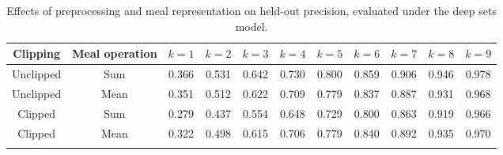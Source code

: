 
\begin{table}[!htbp]
\centering
\begin{tabular}{ccccccccccc}
\toprule
Clipping & Meal operation & $k=1$ & $k=2$ & $k=3$ & $k=4$ & $k=5$ & $k=6$ & $k=7$ & $k=8$ & $k=9$ \\
\midrule
Unclipped & Sum & 0.366 & 0.531 & 0.642 & 0.730 & 0.800 & 0.859 & 0.906 & 0.946 & 0.978 \\
Unclipped & Mean & 0.351 & 0.512 & 0.622 & 0.709 & 0.779 & 0.837 & 0.887 & 0.931 & 0.968 \\
Clipped & Sum & 0.279 & 0.437 & 0.554 & 0.648 & 0.729 & 0.800 & 0.863 & 0.919 & 0.966 \\
Clipped & Mean & 0.322 & 0.498 & 0.615 & 0.706 & 0.779 & 0.840 & 0.892 & 0.935 & 0.970 \\
\bottomrule\\
\end{tabular}
\caption{Effects of preprocessing and meal representation on held-out
precision, evaluated under the deep sets model.}
\label{tab:preprocess_grid}
\end{table}
